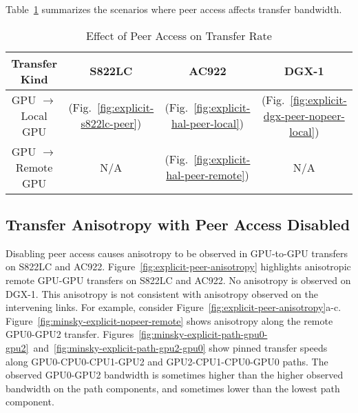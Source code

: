 Table~\ref{tab:explicit-peer-rate} summarizes the scenarios where peer access affects transfer bandwidth.

\begin{table}[H]
	\centering
	\caption[Effect of Peer Access on Transfer Rate]{Effect of Peer Access on Transfer Rate}
	\label{tab:explicit-peer-rate}
	\begin{tabular}{cccc}
		\hline
		\textbf{Transfer Kind}       & \textbf{S822LC}                                   & \textbf{AC922}                                       & \textbf{DGX-1}                                             \\ \hline 
		GPU $\rightarrow$ Local GPU  & \checkmark  (Fig.~\ref{fig:explicit-s822lc-peer}) & \checkmark (Fig.~\ref{fig:explicit-hal-peer-local})  & \checkmark (Fig.~\ref{fig:explicit-dgx-peer-nopeer-local}) \\ \hline
		GPU $\rightarrow$ Remote GPU & N/A                                               & \checkmark (Fig.~\ref{fig:explicit-hal-peer-remote}) & N/A                                                        \\ \hline
	\end{tabular}
\end{table}


\subsection{Transfer Anisotropy with Peer Access Disabled}
\label{sec:explicit-peer-direction}

Disabling peer access causes anisotropy to be observed in GPU-to-GPU transfers on S822LC and AC922.
Figure~\ref{fig:explicit-peer-anisotropy} highlights anisotropic remote GPU-GPU transfers on S822LC and AC922.
No anisotropy is observed on DGX-1.
This anisotropy is not consistent with anisotropy observed on the intervening links.
For example, consider Figure~\ref{fig:explicit-peer-anisotropy}a-c.
Figure~\ref{fig:minsky-explicit-nopeer-remote} shows anisotropy along the remote GPU0-GPU2 transfer.
Figures~\ref{fig:minsky-explicit-path-gpu0-gpu2}~and~\ref{fig:minsky-explicit-path-gpu2-gpu0} show pinned transfer speeds along GPU0-CPU0-CPU1-GPU2 and GPU2-CPU1-CPU0-GPU0 paths.
The observed GPU0-GPU2 bandwidth is sometimes higher than the higher observed bandwidth on the path components, and sometimes lower than the lowest path component.


